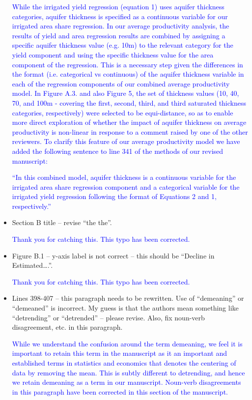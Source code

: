 \documentclass[
]{article}
\begin{document}
\begin{itemize}
\textcolor{blue}{While the irrigated yield regression (equation 1) uses aquifer thickness categories, aquifer thickness is specified as a continuous variable for our irrigated area share regression. In our average productivity analysis, the results of yield and area regression results are combined by assigning a specific aquifer thickness value (e.g. 10m) to the relevant category for the yield component and using the specific thickness value for the area component of the regression. This is a necessary step given the differences in the format (i.e. categorical vs continuous) of the aquifer thickness variable in each of the regression components of our combined average productivity model. In Figure A.3. and also Figure 5, the set of thickness values (10, 40, 70, and 100m - covering the first, second, third, and third saturated thickness categories, respectively) were selected to be equi-distance, so as to enable more direct exploration of whether the impact of aquifer thickness on average productivity is non-linear in response to a comment raised by one of the other reviewers. To clarify this feature of our average productivity model we have added the following sentence to line 341 of the methods of our revised manuscript:}

\textcolor{blue}{``In this combined model, aquifer thickness is a continuous variable for the irrigated area share regression component and a categorical variable for the irrigated yield regression following the format of Equations 2 and 1, respectively.''}

\item Section B title – revise ``the the''.

\textcolor{blue}{Thank you for catching this. This typo has been corrected.}

\item Figure B.1 – y-axis label is not correct – this should be ``Decline in Estimated….''.

\textcolor{blue}{Thank you for catching this. This typo has been corrected.}

\item Lines 398-407 – this paragraph needs to be rewritten. Use of ``demeaning'' or ``demeaned'' is incorrect. My guess is that the authors mean something like ``detrending'' or ``detrended'' – please revise. Also, fix noun-verb disagreement, etc. in this paragraph.

\textcolor{blue}{While we understand the confusion around the term demeaning, we feel it is important to retain this term in the manuscript as it an important and established terms in statistics and economics that denotes the centering of data by removing the mean. This is subtly different to detrending, and hence we retain demeaning as a term in our manuscript. Noun-verb disagreements in this paragraph have been corrected in this section of the manuscript.}


\end{itemize}
\end{document}

